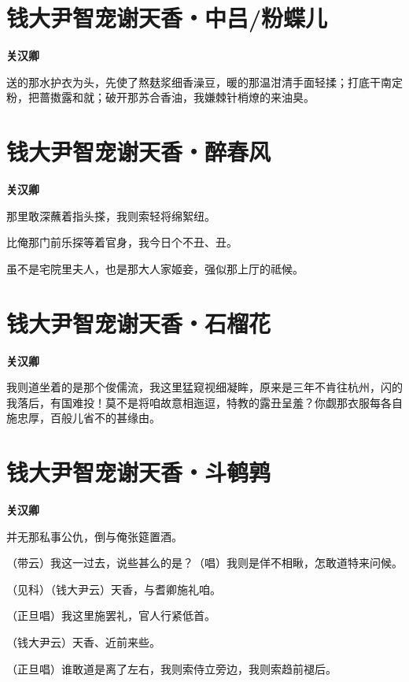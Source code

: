 \documentclass[12pt,a4paper]{ctexbook}
\begin{document}
\section{钱大尹智宠谢天香・中吕/粉蝶儿}
\textbf{关汉卿}\par\vspace{0.5em}
送的那水护衣为头，先使了熬麸浆细香澡豆，暖的那温泔清手面轻揉；打底干南定粉，把蔷擞露和就；破开那苏合香油，我嫌棘针梢燎的来油臭。\par

\section{钱大尹智宠谢天香・醉春风}
\textbf{关汉卿}\par\vspace{0.5em}
那里敢深蘸着指头搽，我则索轻将绵絮纽。\par
比俺那门前乐探等着官身，我今日个不丑、丑。\par
虽不是宅院里夫人，也是那大人家姬妾，强似那上厅的祗候。\par

\section{钱大尹智宠谢天香・石榴花}
\textbf{关汉卿}\par\vspace{0.5em}
我则道坐着的是那个俊儒流，我这里猛窥视细凝眸，原来是三年不肯往杭州，闪的我落后，有国难投！莫不是将咱故意相迤逗，特教的露丑呈羞？你觑那衣服每各自施忠厚，百般儿省不的甚缘由。\par

\section{钱大尹智宠谢天香・斗鹌鹑}
\textbf{关汉卿}\par\vspace{0.5em}
并无那私事公仇，倒与俺张筵置酒。\par
（带云）我这一过去，说些甚么的是？（唱）我则是佯不相瞅，怎敢道特来问候。\par
（见科）（钱大尹云）天香，与耆卿施礼咱。\par
（正旦唱）我这里施罢礼，官人行紧低首。\par
（钱大尹云）天香、近前来些。\par
（正旦唱）谁敢道是离了左右，我则索侍立旁边，我则索趋前褪后。\par
\end{document}
